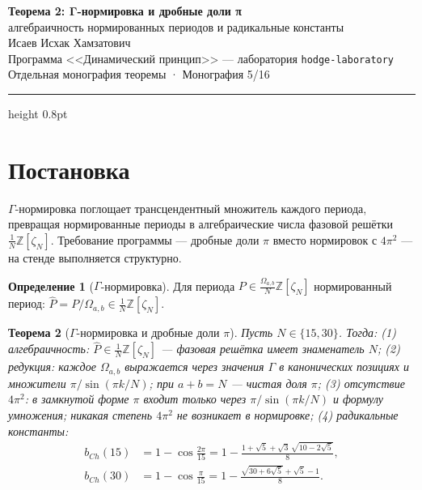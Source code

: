 \documentclass[11pt,a4paper]{article}
\theoremstyle{plain}
\newtheorem{theorem}{Теорема}
\theoremstyle{definition}
\newtheorem{definition}[theorem]{Определение}
\theoremstyle{remark}
\newcommand{\ZZ}{\mathbb{Z}}
\newcommand{\Ga}{\Gamma}
\begin{document}
\begin{center}
{\LARGE\bfseries Теорема 2: Γ-нормировка и дробные доли π}\\[0.4em]
{\large алгебраичность нормированных периодов и радикальные константы}\\[0.6em]
{\normalsize Исаев Исхак Хамзатович}\\[0.2em]
{\small Программа <<Динамический принцип>> --- лаборатория \texttt{hodge-laboratory}}\\[0.15em]
{\small Отдельная монография теоремы · Монография 5/16}
\end{center}
\vspace{0.4em}
{\color{linkblue}\hrule height 0.8pt}
\vspace{0.8em}

\section{Постановка}

$\Ga$-нормировка поглощает трансцендентный множитель каждого
периода, превращая нормированные периоды в алгебраические числа
фазовой решётки $\frac1N\ZZ[\zeta_N]$. Требование программы ---
дробные доли $\pi$ вместо нормировок с $4\pi^2$ --- на стенде
выполняется структурно.

\begin{definition}[$\Ga$-нормировка]
Для периода $P\in\frac{\Omega_{a,b}}{N}\ZZ[\zeta_N]$ нормированный
период: $\widehat{P}=P/\Omega_{a,b}\in\frac1N\ZZ[\zeta_N]$.
\end{definition}

\begin{theorem}[$\Ga$-нормировка и дробные доли $\pi$]\label{th:norm}
Пусть $N\in\{15,30\}$. Тогда:
(1) алгебраичность: $\widehat P\in\frac1N\ZZ[\zeta_N]$ --- фазовая
решётка имеет знаменатель $N$;
(2) редукция: каждое $\Omega_{a,b}$ выражается через значения $\Ga$
в канонических позициях и множители $\pi/\sin(\pi k/N)$; при
$a+b=N$ --- чистая доля $\pi$;
(3) отсутствие $4\pi^2$: в замкнутой форме $\pi$ входит только через
$\pi/\sin(\pi k/N)$ и формулу умножения; никакая степень $4\pi^2$ не
возникает в нормировке;
(4) радикальные константы:
\begin{align}
  b_{Ch}(15)&=1-\cos\frac{2\pi}{15}
  =1-\frac{1+\sqrt5+\sqrt3\,\sqrt{10-2\sqrt5}}{8},\\
  b_{Ch}(30)&=1-\cos\frac{\pi}{15}
  =1-\frac{\sqrt{30+6\sqrt5}+\sqrt5-1}{8}.
\end{align}
\end{theorem}
\end{document}
